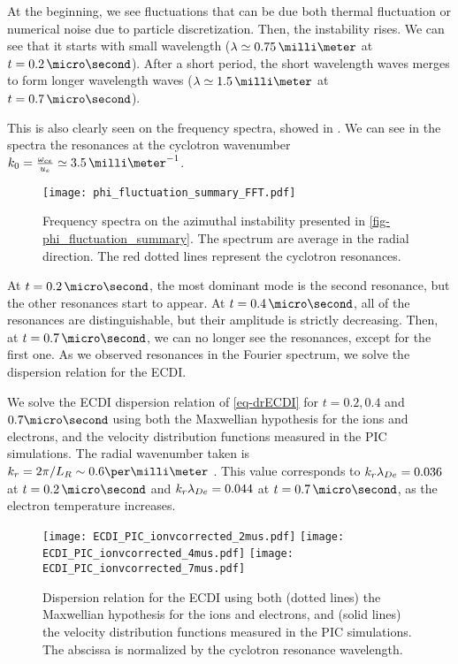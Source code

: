     At the beginning, we see fluctuations that can be due both thermal fluctuation \citep{salpeter1960} or numerical noise due to particle discretization.
    Then, the instability rises.
    We can see that it starts with small wavelength ($\lambda \simeq 0.75\,\milli\meter$ at $t=0.2\,\micro\second$).
    After a short period, the short wavelength waves merges to form longer wavelength waves  ($\lambda \simeq 1.5\,\milli\meter$ at $t=0.7\,\micro\second$).
    
    This is also clearly seen on the frequency spectra, showed in .
    We can see in the spectra the resonances at the cyclotron wavenumber $k_0 = \frac{\oce}{u_e} \simeq 3.5\,\milli\meter^{-1}$.
    
    \begin{figure}[hbtp]
      \centering
      \texttt{[image: phi\_fluctuation\_summary\_FFT.pdf]}
      \caption{Frequency spectra on the azimuthal instability presented in \cref{fig-phi_fluctuation_summary}. The spectrum are average in the radial direction. The red dotted lines represent the cyclotron resonances.}
      \label{fig-phi_fluctuation_summary_FFT}
    \end{figure}
    
    At $t=0.2\,\micro\second$, the most dominant mode is the second resonance, but the other resonances start to appear.
    At $t=0.4\,\micro\second$, all of the resonances are distinguishable, but their amplitude is strictly decreasing.
    Then, at $t=0.7\,\micro\second$, we can no longer see the resonances, except for the first one.
    As we observed resonances in the Fourier spectrum, we solve the dispersion relation for the \ac{ECDI}.
    
    \vspace{1em}
    We solve the \ac{ECDI} dispersion relation of \cref{eq-drECDI} for $t=0.2, 0.4$ and $0.7\micro\second$ using both the Maxwellian hypothesis for the ions and electrons, and the velocity distribution functions measured in the \ac{PIC} simulations.
    The radial wavenumber taken is $k_r = 2 \pi/L_R \sim 0.6 \per\milli\meter$ \citep{lafleur2016,janhunen2018}.
    This value corresponds to $k_r \lambda_{De} = 0.036$ at $t=0.2\,\micro\second$ and $k_r \lambda_{De} = 0.044$ at $t=0.7\,\micro\second$, as the electron temperature increases.
    
    \begin{figure}[hbtp]
      \centering
        \texttt{[image: ECDI\_PIC\_ionvcorrected\_2mus.pdf]} 
        \texttt{[image: ECDI\_PIC\_ionvcorrected\_4mus.pdf]} 
        \texttt{[image: ECDI\_PIC\_ionvcorrected\_7mus.pdf]} 
      \caption{Dispersion relation for the \ac{ECDI} using both (dotted lines) the Maxwellian hypothesis for the ions and electrons, and (solid lines) the velocity distribution functions measured in the \ac{PIC} simulations. The abscissa is normalized by the cyclotron resonance wavelength.}
      \label{fig-DRECDI}
    \end{figure}
    
